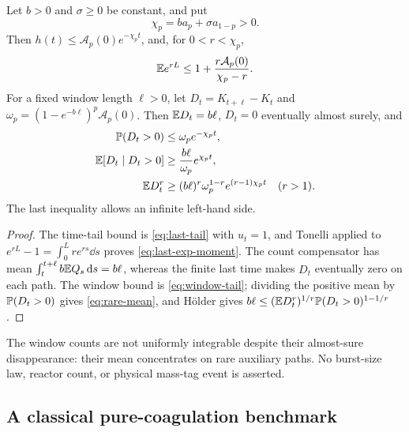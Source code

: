 \begin{corollary}
\label{cor:last-moments-counts}
Let $b>0$ and $\sigma\geq0$ be constant, and put
\begin{equation}
 \chi_p=b a_p+\sigma a_{1-p}>0.
 \label{eq:last-rate}
\end{equation}
Then $h(t)\leq\mathcal A_p(0)e^{-\chi_p t}$, and, for $0<r<\chi_p$,
\begin{equation}
 \mathbb E e^{rL}\leq1+\frac{r\mathcal A_p(0)}{\chi_p-r}.
 \label{eq:last-exp-moment}
\end{equation}
For a fixed window length $\ell>0$, let
$D_t=K_{t+\ell}-K_t$ and $\omega_p=(1-e^{-b\ell})^p\mathcal A_p(0)$.
Then $\mathbb E D_t=b\ell$, $D_t=0$ eventually almost surely, and
\begin{align}
 \mathbb P(D_t>0)&\leq\omega_p e^{-\chi_p t},\label{eq:rare-window}\\
 \mathbb E[D_t\mid D_t>0]&\geq\frac{b\ell}{\omega_p}e^{\chi_p t},
                     \label{eq:rare-mean}\\
 \mathbb E D_t^r&\geq(b\ell)^r\omega_p^{1-r}e^{(r-1)\chi_p t}
                     \quad(r>1).\label{eq:rare-power}
\end{align}
The last inequality allows an infinite left-hand side.
\end{corollary}

\begin{proof}
The time-tail bound is \eqref{eq:last-tail} with $u_t=1$, and Tonelli
applied to $e^{rL}-1=\int_0^Lre^{rs}\dd s$ proves
\eqref{eq:last-exp-moment}. The count compensator has mean
$\int_t^{t+\ell}b\mathbb E Q_s\,\mathrm d s=b\ell$, whereas the finite last time
makes $D_t$ eventually zero on each path. The window bound is
\eqref{eq:window-tail}; dividing the positive mean by
$\mathbb P(D_t>0)$ gives \eqref{eq:rare-mean}, and H\"older gives
$b\ell\leq(\mathbb E D_t^r)^{1/r}\mathbb P(D_t>0)^{1-1/r}$.
\end{proof}

The window counts are not uniformly integrable despite their
almost-sure disappearance: their mean concentrates on rare auxiliary
paths. No burst-size law, reactor count, or physical mass-tag event
is asserted.

\subsection{A classical pure-coagulation benchmark}
\label{sec:borel-benchmark}


